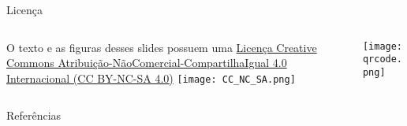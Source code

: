 \maketitle

\begin{frame}{Licença}
    \begin{columns}
        \begin{column}{0.5\textwidth}
            O texto e as figuras desses slides possuem uma
            \href{https://creativecommons.org/licenses/by-nc-sa/4.0/deed.pt}{Licença
            Creative Commons
            Atribuição-NãoComercial-CompartilhaIgual 4.0 Internacional (CC BY-NC-SA 4.0)}
            \vfill
            \centering
            \vspace{1em}
            \texttt{[image: CC\_NC\_SA.png]}
        \end{column}
        \begin{column}{0.5\textwidth}
            \centering
            \texttt{[image: qrcode.png]}
        \end{column}
    \end{columns}
    \vfill
\end{frame}

\begin{frame}[allowframebreaks]{Referências}
	\printbibliography
\end{frame}

